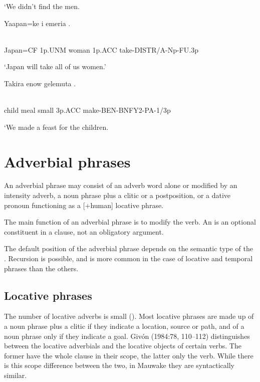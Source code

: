 `We didn't find the men.

\ea%
\label{ex:x850}
\gll Yaapan=ke  i  emeria  . \\
      \\
\glt
\z

Japan=CF  1p.UNM  woman  1p.ACC  take-DISTR/A-Np-FU.3p

`Japan will take all of us women.'

\ea%
\label{ex:x851}
\gll Takira  enow  gelemuta  . \\
      \\
\glt
\z

child  meal  small  3p.ACC  make-BEN-BNFY2-PA-1/3p

`We made a feast for the children.

\section{Adverbial phrases}
{}
An adverbial phrase may consist of an adverb word alone or modified by an intensity adverb, a noun phrase plus a clitic or a postposition, or a dative pronoun functioning as a [+human] locative phrase.

The main function of an adverbial phrase is to modify the verb. An  is an optional constituent in a clause, not an obligatory argument. 

The default position of the adverbial phrase depends on the semantic type of the . Recursion is possible, and is more common in the case of locative and temporal phrases than the others.

\subsection{Locative phrases}
{}
The number of locative adverbs is small (). Most locative phrases are made up of a noun phrase plus a clitic if they indicate a location, source or path, and of a noun phrase only if they indicate a goal. Giv\'on (1984:78, 110--112) distinguishes between the locative adverbials and the locative objects of certain verbs. The former have the whole clause in their scope, the latter only the verb. While there is this scope difference between the two, in Mauwake they are syntactically similar. 

